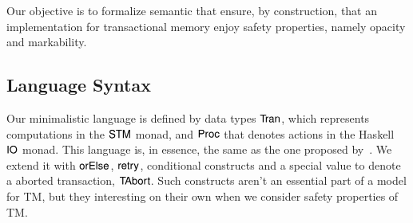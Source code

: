 \documentclass[3p,times,procedia]{elsarticle}
\def\resethooks{%
  \global\let\SaveRestoreHook\empty
  \global\let\ColumnHook\empty}
\newlength{\blanklineskip}
\let\hspre\empty
\let\hspost\empty
\theoremstyle{definition}
\newcommand{\D}[1]{\blue{\mathsf{#1}}}
\newcommand{\C}[1]{\red{\mathsf{#1}}}
\newcommand{\F}[1]{\green{\mathsf{#1}}}
\begin{document}
Our objective is to formalize semantic that ensure, by construction, that an
implementation for transactional memory enjoy safety properties, namely opacity and markability. 

\subsection{Language Syntax}\label{sec:stm-syntax}

Our minimalistic language is defined by data types \ensuremath{\D{Tran}}, which
represents computations in the \ensuremath{\D{STM}} monad, and \ensuremath{\D{Proc}} that denotes
actions in the Haskell \ensuremath{\D{IO}} monad. This language is, in essence,
the same as the one proposed by~\cite{Hu08}. We extend it with
\ensuremath{\F{orElse}}, \ensuremath{\F{retry}}, conditional constructs and a special value to
denote a aborted transaction, \ensuremath{\C{TAbort}}. Such constructs aren't
an essential part of a model for TM, but they interesting
on their own when we consider safety properties of TM.

\resethooks
\end{document}
